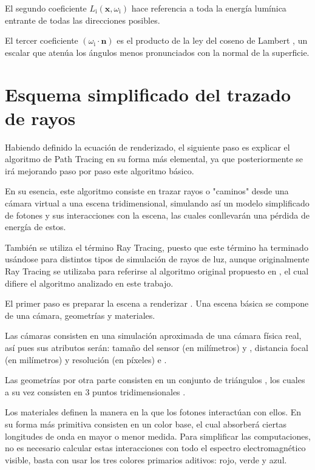 El segundo coeficiente $L_{\text{i}}(\mathbf {x} ,\omega _{\text{i}})$ hace referencia a toda la energía lumínica entrante de todas las direcciones posibles.

El tercer coeficiente $(\omega _{\text{i}}\cdot \mathbf {n})$ es el producto de la ley del coseno de Lambert \cite{photometria}, un escalar que atenúa los ángulos menos pronunciados con la normal de la superficie.


	\section{Esquema simplificado del trazado de rayos}
	
Habiendo definido la ecuación de renderizado, el siguiente paso es explicar el algoritmo de Path Tracing en su forma más elemental, ya que posteriormente se irá mejorando paso por paso este algoritmo básico.

En su esencia, este algoritmo consiste en trazar rayos o "caminos" desde una cámara virtual a una escena tridimensional, simulando así un modelo simplificado de fotones y sus interacciones con la escena, las cuales conllevarán una pérdida de energía de estos.


También se utiliza el término Ray Tracing, puesto que este término ha terminado usándose para distintos tipos de simulación de rayos de luz, aunque originalmente Ray Tracing se utilizaba para referirse al algoritmo original propuesto en , el cual difiere el algoritmo analizado en este trabajo. 


El primer paso es preparar la escena a renderizar . Una escena básica se compone de una cámara, geometrías y materiales.

Las cámaras  consisten en una simulación aproximada de una cámara física real, así pues sus atributos serán: tamaño del sensor (en milímetros)  y , distancia focal (en milímetros)  y resolución (en píxeles)  e . 

Las geometrías  por otra parte consisten en un conjunto de triángulos , los cuales a su vez consisten en 3 puntos tridimensionales .

Los materiales  definen la manera en la que los fotones interactúan con ellos. En su forma más primitiva consisten en un color base, el cual absorberá ciertas longitudes de onda en mayor o menor medida. Para simplificar las computaciones, no es necesario calcular estas interacciones con todo el espectro electromagnético visible, basta con usar los tres colores primarios aditivos: rojo, verde y azul.


